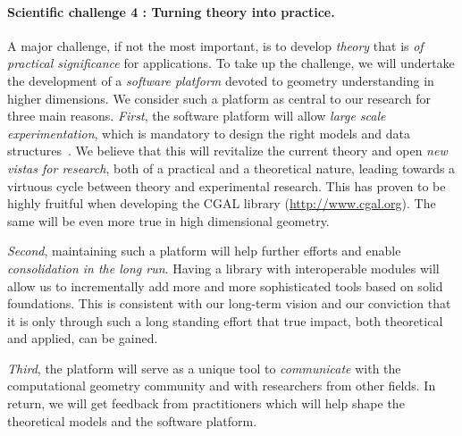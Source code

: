 \vspace{-3.1mm}

\paragraph{Scientific challenge 4 : Turning theory into practice.}
A major challenge, if not the most important, is to develop {\em theory} that is {\em of practical significance} for applications.  To take up the challenge, we will %
undertake the development of a {\em software platform} devoted to geometry understanding in higher dimensions.  We consider such a platform as central to our research for three main reasons.  {\em First}, the software platform will allow {\em large scale experimentation}, which is mandatory to design the right models and data structures~\cite{bm-dssc-2012}. We believe that this will revitalize the current theory and open {\em new vistas for research}, both of a practical and a theoretical nature, leading towards a virtuous cycle between theory and experimental research. This has proven to be highly fruitful when developing the CGAL library (\url{http://www.cgal.org}{}). The same will be even more true in high dimensional geometry.

{\em Second}, maintaining such a platform will help further efforts
and enable {\em consolidation in the long run}.  Having a library with interoperable modules will allow us to incrementally add more and more sophisticated tools based on solid foundations.  This is consistent with our long-term vision and our conviction that it is only through such a long standing effort that true impact, both theoretical and applied, can be gained.

{\em Third}, the platform will serve as a unique tool to {\em communicate} with the computational geometry community and with researchers from other fields. 
 In return, we will get feedback from practitioners which will help shape the theoretical models and the software platform.
\vspace{-3.1mm} 

